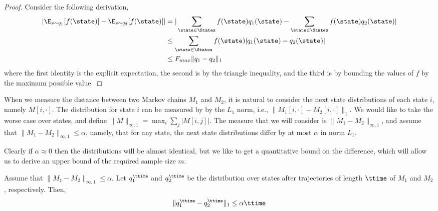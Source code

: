 \begin{proof} Consider the following derivation,
\begin{align*} |\E_{s\sim q_1}[f(\state)]- \E_{s\sim q_2}[f(\state)]|
&=|\sum_{\state \in \States} f(\state)q_1(\state) - \sum_{\state \in \States} f(\state)q_2(\state)| \\
&\leq \sum_{\state \in \States} f(\state)|q_1(\state) - q_2(\state)|\\
 &\leq F_{max} \|q_1-q_2\|_1
\end{align*}
where the first identity is the explicit expectation, the second is by the triangle inequality, and the third is by bounding the values of $f$ by the maximum possible value.
\end{proof}

When we measure the distance between two Markov chains $M_1$ and
$M_2$, it is natural to consider the next state distributions of
each state $i$, namely $M[i,\cdot]$. The distribution for state $i$
can be measured by by the $L_1$ norm, i.e., $\|
M_1[i,\cdot]-M_2[i,\cdot]\|_1 $. We would like to take the worse
case over states, and define $\|M\|_{\infty,1} = \max_i \sum_j
|M[i,j]|$. The measure that we will consider is
$\|M_1-M_2\|_{\infty,1}$, and assume that
$\|M_1-M_2\|_{\infty,1}\leq \alpha$, namely, that for any state, the
next state distributions differ by at most $\alpha$ in norm $L_1$.



Clearly if $\alpha\approx 0$ then the distributions will be almost
identical, but we like to get a quantitative bound on the
difference, which will allow us to derive an upper bound of the
required sample size $m$.



\begin{theorem}
\label{thm:l1-error}
%
Assume that $\|M_1-M_2\|_{\infty,1}\leq \alpha$.
%
Let $q_1^\ttime$ and $q_2^\ttime$ be the distribution over states
after trajectories  of length $\ttime$ of $M_1$ and $M_2$,
respectively. Then,
\[
\|q_1^\ttime-q_2^\ttime\|_1\leq \alpha  \ttime
\]
\end{theorem}

